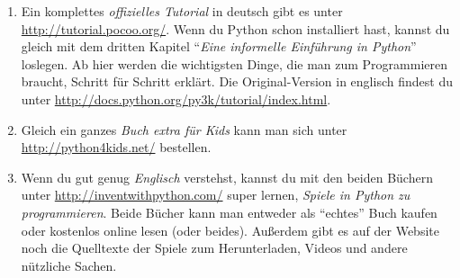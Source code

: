 	\begin{enumerate}
		\item Ein komplettes \emph{offizielles Tutorial} in deutsch gibt es unter \url{http://tutorial.pocoo.org/}. Wenn du Python schon installiert hast, kannst du gleich mit dem dritten Kapitel \enquote{\emph{Eine informelle Einführung in Python}} loslegen. Ab hier werden die wichtigsten Dinge, die man zum Programmieren braucht, Schritt für Schritt erklärt. Die Original-Version in englisch findest du unter \url{http://docs.python.org/py3k/tutorial/index.html}.
		
		\item Gleich ein ganzes \emph{Buch extra für Kids} kann man sich unter \url{http://python4kids.net/} bestellen.
		
		\item Wenn du gut genug \emph{Englisch} verstehst, kannst du mit den beiden Büchern unter \url{http://inventwithpython.com/} super lernen, \emph{Spiele in Python zu programmieren}. Beide Bücher kann man entweder als \enquote{echtes} Buch kaufen oder kostenlos online lesen (oder beides). Außerdem gibt es auf der Website noch die Quelltexte der Spiele zum Herunterladen, Videos und andere nützliche Sachen.
	\end{enumerate}
	
	
	
